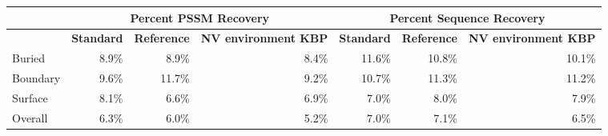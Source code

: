 
\begin{tabular}{|l||r|r|r|r|r|r|}
\hline
 & \multicolumn{3}{c}{\textbf{Percent PSSM Recovery}} & \multicolumn{3}{|c|}{\textbf{Percent Sequence Recovery}}\\
\hline
  & \textbf{Standard} & \textbf{Reference} & \textbf{NV environment KBP} & \textbf{Standard} & \textbf{Reference} & \textbf{NV environment KBP} \\
\hline
\hline
Buried & 8.9\% & 8.9\% & 8.4\% & 11.6\% & 10.8\% & 10.1\%\\
\hline
Boundary & 9.6\% & 11.7\% & 9.2\% & 10.7\% & 11.3\% & 11.2\%\\
\hline
Surface & 8.1\% & 6.6\% & 6.9\% & 7.0\% & 8.0\% & 7.9\%\\
\hline
Overall & 6.3\% & 6.0\% & 5.2\% & 7.0\% & 7.1\% & 6.5\%\\
\hline
\end{tabular}